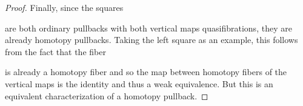 \begin{prop}
\begin{proof}
        Finally, since the squares 
        \begin{center}
        \end{center}
        are both ordinary pullbacks %
        with both vertical maps quasifibrations, they are already homotopy pullbacks. %
        Taking the left square as an example, this follows from the fact that the fiber
        \begin{center}
        \end{center}
        is already a homotopy fiber and so the map between homotopy fibers of the vertical maps is the identity and thus a weak equivalence.
        But this is an equivalent characterization of a homotopy pullback. %
    \end{proof}
\end{prop}
